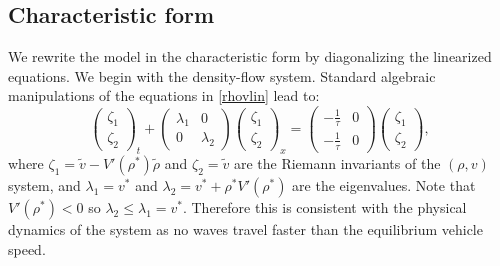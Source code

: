 \documentclass[preprint]{elsarticle}
\begin{document}
\subsection{Characteristic form}
We rewrite the model in the characteristic form by diagonalizing the linearized equations. 
We begin with the density-flow system. Standard algebraic manipulations of the equations in \eqref{rhovlin} lead to:
\begin{equation}
\begin{pmatrix}
\zeta_1 \\ \zeta_2
\end{pmatrix}_t
+ \begin{pmatrix}
\lambda_1 & 0 \\
0 & \lambda_2 
\end{pmatrix}
\begin{pmatrix}
\zeta_1 \\ \zeta_2
\end{pmatrix}_x
= \begin{pmatrix}
-\frac{1}{\tau} & 0 \\
-\frac{1}{\tau} & 0
\end{pmatrix}
\begin{pmatrix}
\zeta_1 \\ \zeta_2
\end{pmatrix},
\end{equation}
where $\zeta_1 = \tilde{v} - V'( \rho^* )\tilde{\rho}$ and $\zeta_2 = \tilde{v}$ are the Riemann invariants of the $(\rho, v)$ system, and $\lambda_1 = v^*$ and $\lambda_2 = v^* + \rho^* V'( \rho^*)$ are the eigenvalues. Note that $V'( \rho^*) < 0$ so $\lambda_2 \leq \lambda_1 = v^*$. Therefore this is consistent with the physical dynamics of the system as no waves travel faster than the equilibrium vehicle speed. 
\end{document}
